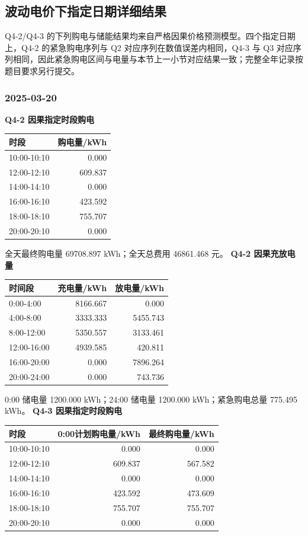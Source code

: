 \subsection{波动电价下指定日期详细结果}
Q4-2/Q4-3 的下列购电与储能结果均来自严格因果价格预测模型。四个指定日期上，Q4-2 的紧急购电序列与 Q2 对应序列在数值误差内相同，Q4-3 与 Q3 对应序列相同，因此紧急购电区间与电量与本节上一小节对应结果一致；完整全年记录按题目要求另行提交。

\subsubsection{2025-03-20}
\textbf{Q4-2 因果指定时段购电}
\begin{longtable}[]{@{}lr@{}}\toprule 时段 & 购电量/kWh \\\midrule\endhead
10:00-10:10&0.000\\12:00-12:10&609.837\\14:00-14:10&0.000\\16:00-16:10&423.592\\18:00-18:10&755.707\\20:00-20:10&0.000\\\bottomrule\end{longtable}
全天最终购电量 69708.897 kWh；全天总费用 46861.468 元。
\textbf{Q4-2 因果充放电量}
\begin{longtable}[]{@{}lrr@{}}\toprule 时间段&充电量/kWh&放电量/kWh\\\midrule\endhead
0:00-4:00&8166.667&0.000\\4:00-8:00&3333.333&5455.743\\8:00-12:00&5350.557&3133.461\\12:00-16:00&4939.585&420.811\\16:00-20:00&0.000&7896.264\\20:00-24:00&0.000&743.736\\\bottomrule\end{longtable}
0:00 储电量 1200.000 kWh；24:00 储电量 1200.000 kWh；紧急购电总量 775.495 kWh。
\textbf{Q4-3 因果指定时段购电}
\begin{longtable}[]{@{}lrr@{}}\toprule 时段&0:00计划购电量/kWh&最终购电量/kWh\\\midrule\endhead
10:00-10:10&0.000&0.000\\12:00-12:10&609.837&567.582\\14:00-14:10&0.000&0.000\\16:00-16:10&423.592&473.609\\18:00-18:10&755.707&755.707\\20:00-20:10&0.000&0.000\\\bottomrule\end{longtable}
